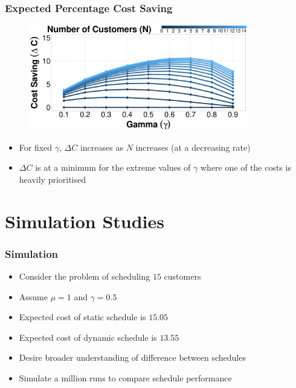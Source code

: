 \documentclass{beamer}
\begin{document}
\begin{frame}
	\frametitle{Expected Percentage Cost Saving}

	\begin{figure}
		\centering
		\includegraphics[width=0.85\textwidth]{Cost_Saving_Line_Num.eps}
	\end{figure}

	\begin{itemize}
		\item For fixed $\gamma$, $\Delta C$ increases as $N$ increases (at a decreasing rate)
		\item $\Delta C$ is at a minimum for the extreme values of $\gamma$ where one of the costs is heavily prioritised
	\end{itemize}
\end{frame}

\section{Simulation Studies}

\begin{frame}
	\frametitle{Simulation}

	\begin{itemize}
		\item Consider the problem of scheduling $15$ customers
		\item Assume $\mu = 1$ and $\gamma = 0.5$
		\item Expected cost of static schedule is $15.05$
		\item Expected cost of dynamic schedule is $13.55$
		\item Desire broader understanding of difference between schedules
		\item Simulate a million runs to compare schedule performance
	\end{itemize}
\end{frame}
\end{document}
